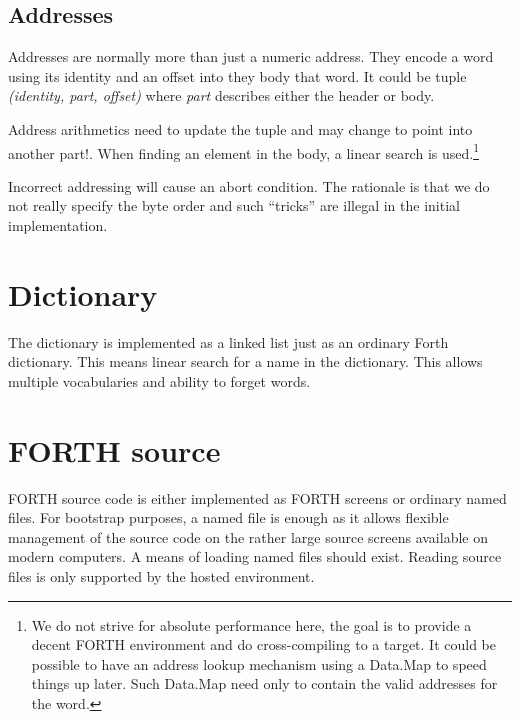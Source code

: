 \documentclass[a4paper]{article}
\begin{document}
\subsection{Addresses}
Addresses are normally more than just a numeric address. They encode a word using its identity and an offset into they body  that word. It could be tuple {\it (identity, part, offset)\/} where {\it part\/} describes either the header or body.

Address arithmetics need to update the tuple and may change to point into another part!. When finding an element in the body, a linear search is used.\footnote{We do not strive for absolute performance here, the goal is to provide a decent FORTH environment and do cross-compiling to a target. It could be possible to have an address lookup mechanism using a Data.Map to speed things up later. Such Data.Map need only to contain the valid addresses for the word.}

Incorrect addressing will cause an abort condition. The rationale is that we do not really specify the byte order and such ``tricks'' are illegal in the initial implementation.

\section{Dictionary}
The dictionary is implemented as a linked list just as an ordinary Forth dictionary. This means linear search for a name in the dictionary. This allows multiple vocabularies and ability to forget words.

\section{FORTH source}
FORTH source code is either implemented as FORTH screens or ordinary named files. For bootstrap purposes, a named file is enough as it allows flexible management of the source code on the rather large source screens available on modern computers. A means of loading named files should exist. Reading source files is only supported by the hosted environment.
\end{document}
